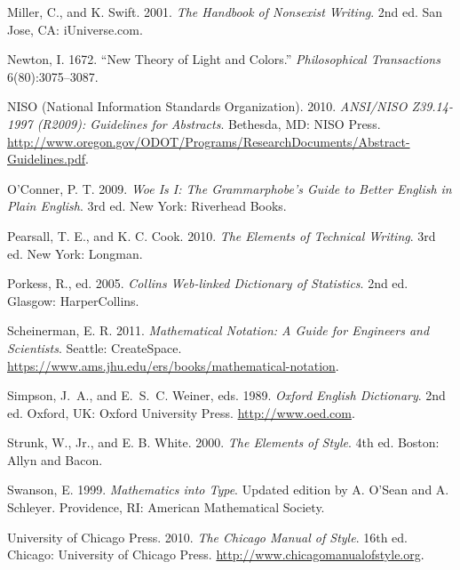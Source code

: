 \documentclass{wscpaperproc}
\theoremstyle{wsc}
\begin{document}
\begin{hangref}
\item
Miller, C., and K. Swift.  2001.  {\em The Handbook of Nonsexist Writing}.
2nd ed.  San Jose, CA: iUniverse.com.



\item
Newton, I\@.  1672.  ``New Theory of Light and Colors.''  {\em Philosophical
Transactions} 6(80):3075--3087.


\item
NISO (National Information Standards Organization).
  2010.  {\it ANSI/NISO Z39.14-1997 (R2009): Guidelines for Abstracts}. Bethesda, MD: NISO Press.  
\href{http://www.oregon.gov/ODOT/Programs/ResearchDocuments/Abstract-Guidelines.pdf}{%
\url{http://www.oregon.gov/ODOT/Programs/ResearchDocuments/Abstract-Guidelines.pdf}}\textcolor{black}{.}

\item
O'Conner, P. T\@.  2009.  \textit{Woe Is I: The Grammarphobe's Guide to
Better English in Plain English}.  3rd ed.  New York: Riverhead Books.

\item
Pearsall, T. E., and K. C. Cook.  2010.  \textit{The Elements of Technical
Writing}.  3rd ed.  New York: Longman.

\item
Porkess, R., ed.  2005.  \textit{Collins Web-linked Dictionary of
Statistics}.  2nd ed.  Glasgow: HarperCollins.

\item
Scheinerman, E. R\@.  2011.  \textit{Mathematical Notation: A Guide for
Engineers and Scientists}.  Seattle: CreateSpace.
\href{https://www.ams.jhu.edu/ers/books/mathematical-notation}%
{\url{https://www.ams.jhu.edu/ers/books/mathematical-notation}}\textcolor{black}{.}

\item
Simpson, J.~A., and E.~S.~C. Weiner, eds. 1989.
{\em Oxford English Dictionary}. 2nd ed.
Oxford, UK: Oxford University Press.
\href{http://www.oed.com}{%
\url{http://www.oed.com}}\textcolor{black}{.}


\item
Strunk, W., Jr., and E. B. White.  2000.  {\em The Elements of Style}.
4th ed.  Boston: Allyn and Bacon.


\item
Swanson, E\@.  1999.  {\it Mathematics into Type}.  Updated edition by
A. O'Sean and A. Schleyer.  Providence, RI: American
Mathematical Society.

\item
University of Chicago Press. 2010.
\textit{The Chicago Manual of Style}.  16th ed.  Chicago: University of Chicago Press.
\href{http://www.chicagomanualofstyle.org}{%
\url{http://www.chicagomanualofstyle.org}}\textcolor{black}{.}





\end{hangref}
\end{document}
